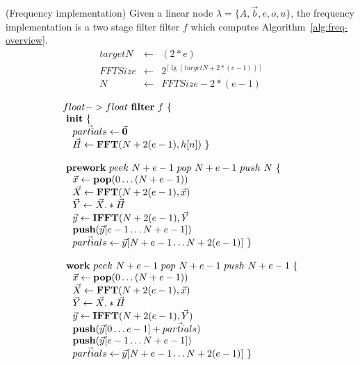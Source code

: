 \begin{transformation} (Frequency implementation)
Given a linear node $\lambda = \{A, {\vec b}, e, o, u\}$, 
the frequency implementation is a two stage filter filter $f$ which
computes Algorithm~\ref{alg:freq-overview}. 
\\
\begin{equation} \nonumber
  \begin{array}{rcl}
    targetN & \leftarrow & (2*e) \\
    FFTSize & \leftarrow & 2^{\lceil \lg(targetN + 2*(e-1)) \rceil} \\
    N       & \leftarrow & FFTSize - 2*(e-1) \\ 
  \end{array}
\end{equation}
\begin{equation} \nonumber
  \begin{array}{l}
    float->float~{\bf filter}~f~\{ \\
    ~{\bf init}~\{ \\
    ~~~\vec{partials} \leftarrow \vec{\mathbf{0}} \\
    ~~~\vec{H} \leftarrow \mathbf{FFT}(N+2(e-1),h[n])~\} \\
    \\
    ~{\bf prework}~peek~N+e-1~pop~N+e-1~push~N~\{\\
    ~~~\vec{x} \leftarrow \mathbf{pop}(0 \dots (N+e-1)) \\
    ~~~\vec{X} \leftarrow \mathbf{FFT} (N+2(e-1), \vec{x}) \\
    ~~~\vec{Y} \leftarrow \vec{X} .* \vec{H} \\
    ~~~\vec{y} \leftarrow \mathbf{IFFT}(N+2(e-1), \vec{Y} \\
    ~~~\mathbf{push}(\vec{y}[e-1 \dots N+e-1]) \\
    ~~~\vec{partials} \leftarrow \vec{y}[N+e-1 \dots N+2(e-1)]~\} \\
    \\
    ~{\bf work}~peek~N+e-1~pop~N+e-1~push~N+e-1~\{ \\
    ~~~\vec{x} \leftarrow \mathbf{pop}(0 \dots (N+e-1)) \\
    ~~~\vec{X} \leftarrow \mathbf{FFT} (N+2(e-1), \vec{x}) \\
    ~~~\vec{Y} \leftarrow \vec{X} .* \vec{H} \\
    ~~~\vec{y} \leftarrow \mathbf{IFFT}(N+2(e-1), \vec{Y}) \\
    ~~~\mathbf{push}(\vec{y}[0 \dots e-1] + \vec{partials})\\
    ~~~\mathbf{push}(\vec{y}[e-1 \dots N+e-1]) \\
    ~~~\vec{partials} \leftarrow \vec{y}[N+e-1 \dots N+2(e-1)]~\} \\
  \end{array} \\
\end{equation}
\label{trans:freq}
\end{transformation}



